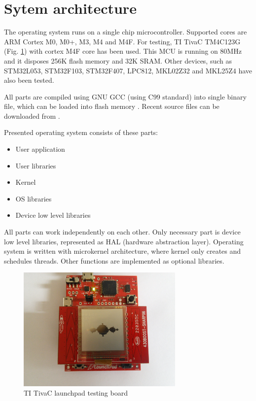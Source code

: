 \documentclass[a4paper, conference]{IEEEtran}
\begin{document}
\section{Sytem architecture}

The operating system runs on a single chip microcontroller. Supported cores are ARM Cortex M0, M0+, M3, M4 and M4F. For testing, TI TivaC TM4C123G \cite{bib:ti_launchpad} (Fig. \ref{fig_ti_launchpad}) with cortex M4F core has been used. This MCU is running on 80MHz and it disposes 256K flash memory and 32K SRAM. Other devices, such as STM32L053, STM32F103, STM32F407, LPC812, MKL02Z32 and MKL25Z4 have also been tested.

All parts are compiled using GNU GCC (using C99 standard) into single binary file, which can be loaded into flash memory \cite{bib:lm4flash}. Recent source files can be downloaded from \cite{bib:suzuha_git}.

Presented operating system consists of these parts:

\begin{itemize}
	\item User application
	\item User libraries
	\item Kernel
	\item OS libraries
	\item Device low level libraries
\end{itemize}

All parts can work independently on each other. Only necessary part is device low level libraries, represented as HAL
(hardware abstraction layer). Operating system is written with microkernel architecture, where kernel only creates and schedules threads. Other functions are implemented as optional libraries.

\renewcommand{\figurename}{Fig.}
\begin{figure}[!t]
\centering
\includegraphics[width=3.2in]{testing_board_01.jpg}
\caption{TI TivaC launchpad testing board}
\label{fig_ti_launchpad}
\end{figure}
\end{document}
